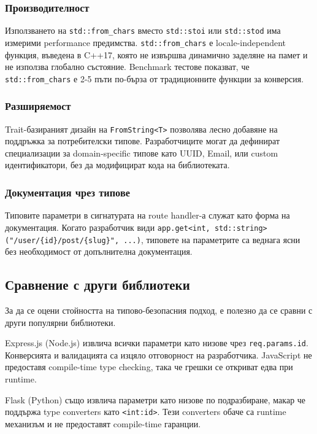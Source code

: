 \subsubsection{Производителност}

Използването на \texttt{std::from\_chars} вместо \texttt{std::stoi} или \texttt{std::stod} има измерими performance предимства. \texttt{std::from\_chars} е locale-independent функция, въведена в C++17, която не извършва динамично заделяне на памет и не използва глобално състояние. Benchmark тестове показват, че \texttt{std::from\_chars} е 2-5 пъти по-бърза от традиционните функции за конверсия.

\subsubsection{Разширяемост}

Trait-базираният дизайн на \texttt{FromString<T>} позволява лесно добавяне на поддръжка за потребителски типове. Разработчиците могат да дефинират специализации за domain-specific типове като UUID, Email, или custom идентификатори, без да модифицират кода на библиотеката.

\subsubsection{Документация чрез типове}

Типовите параметри в сигнатурата на route handler-а служат като форма на документация. Когато разработчик види \texttt{app.get<int, std::string>("/user/\{id\}/post/\{slug\}", ...)}, типовете на параметрите са веднага ясни без необходимост от допълнителна документация.

\subsection{Сравнение с други библиотеки}

За да се оцени стойността на типово-безопасния подход, е полезно да се сравни с други популярни библиотеки.

Express.js (Node.js) извлича всички параметри като низове чрез \texttt{req.params.id}. Конверсията и валидацията са изцяло отговорност на разработчика. JavaScript не предоставя compile-time type checking, така че грешки се откриват едва при runtime.

Flask (Python) също извлича параметри като низове по подразбиране, макар че поддържа type converters като \texttt{<int:id>}. Тези converters обаче са runtime механизъм и не предоставят compile-time гаранции.

